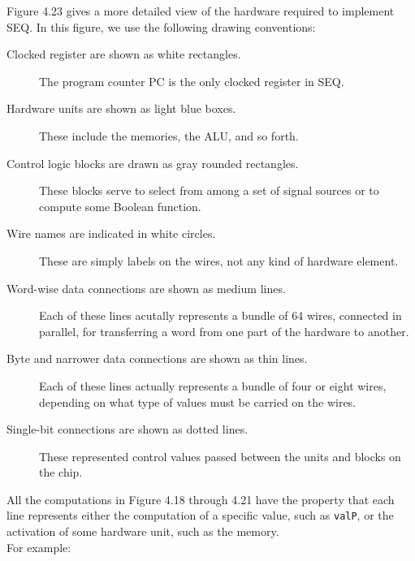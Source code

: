 \documentclass[11pt]{article}
\begin{document}
Figure 4.23 gives a more detailed view of the hardware required to implement SEQ. In this figure, we use the following drawing conventions:\\
\begin{description}
\item[{Clocked register are shown as white rectangles.}] The program counter PC is the only clocked register in SEQ.\\
\item[{Hardware units are shown as light blue boxes.}] These include the memories, the ALU, and so forth.\\
\item[{Control logic blocks are drawn as gray rounded rectangles.}] These blocks serve to select from among a set of signal sources or to compute some Boolean function.\\
\item[{Wire names are indicated in white circles.}] These are simply labels on the wires, not any kind of hardware element.\\
\item[{Word-wise data connections are shown as medium lines.}] Each of these lines acutally represents a bundle of 64 wires, connected in parallel, for transferring a word from one part of the hardware to another.\\
\item[{Byte and narrower data connections are shown as thin lines.}] Each of these lines actually represents a bundle of four or eight wires, depending on what type of values must be carried on the wires.\\
\item[{Single-bit connections are shown as dotted lines.}] These represented control values passed between the units and blocks on the chip.\\
\end{description}



All the computations in Figure 4.18 through 4.21 have the property that each line represents either the computation of a specific value, such as \texttt{valP}, or the activation of some hardware unit, such as the memory.\\

For example:\\
\end{document}

